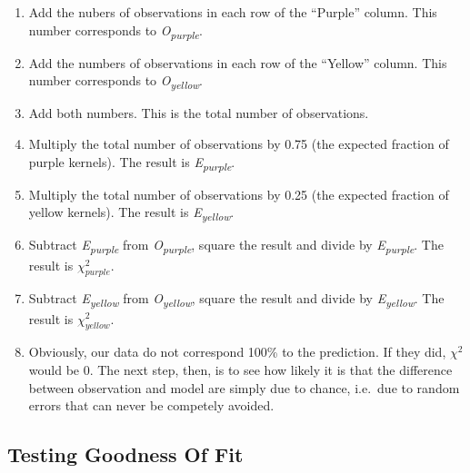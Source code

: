 \documentclass[]{book}
\providecommand{\tightlist}{%
  \setlength{\itemsep}{0pt}\setlength{\parskip}{0pt}}
\begin{document}
\begin{enumerate}
\def\labelenumi{\arabic{enumi}.}
\tightlist
\item
  Add the nubers of observations in each row of the ``Purple'' column.
  This number corresponds to \emph{O\textsubscript{purple}}.\\
\item
  Add the numbers of observations in each row of the ``Yellow'' column.
  This number corresponds to \emph{O\textsubscript{yellow}}.\\
\item
  Add both numbers. This is the total number of observations.
\item
  Multiply the total number of observations by 0.75 (the expected
  fraction of purple kernels). The result is
  \emph{E\textsubscript{purple}}.
\item
  Multiply the total number of observations by 0.25 (the expected
  fraction of yellow kernels). The result is
  \emph{E\textsubscript{yellow}}.
\item
  Subtract \emph{E\textsubscript{purple}} from
  \emph{O\textsubscript{purple}}, square the result and divide by
  \emph{E\textsubscript{purple}}. The result is \(\chi^2_{purple}\).
\item
  Subtract \emph{E\textsubscript{yellow}} from
  \emph{O\textsubscript{yellow}}, square the result and divide by
  \emph{E\textsubscript{yellow}}. The result is \(\chi^2_{yellow}\).
\item
  Obviously, our data do not correspond 100\% to the prediction. If they
  did, \(\chi^2\) would be 0. The next step, then, is to see how likely
  it is that the difference between observation and model are simply due
  to chance, i.e.~due to random errors that can never be competely
  avoided.
\end{enumerate}

\subsection{Testing Goodness Of Fit}\label{testing-goodness-of-fit}
\end{document}
